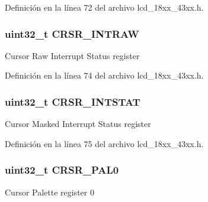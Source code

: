 Definición en la línea 72 del archivo lcd\+\_\+18xx\+\_\+43xx.\+h.

\subsubsection[{\texorpdfstring{C\+R\+S\+R\+\_\+\+I\+N\+T\+R\+AW}{CRSR_INTRAW}}]{ uint32\+\_\+t C\+R\+S\+R\+\_\+\+I\+N\+T\+R\+AW}\hypertarget{struct_l_p_c___l_c_d___t_a874b3ea8395c0fc025398db46000936f}{}\label{struct_l_p_c___l_c_d___t_a874b3ea8395c0fc025398db46000936f}
Cursor Raw Interrupt Status register 

Definición en la línea 74 del archivo lcd\+\_\+18xx\+\_\+43xx.\+h.

\subsubsection[{\texorpdfstring{C\+R\+S\+R\+\_\+\+I\+N\+T\+S\+T\+AT}{CRSR_INTSTAT}}]{ uint32\+\_\+t C\+R\+S\+R\+\_\+\+I\+N\+T\+S\+T\+AT}\hypertarget{struct_l_p_c___l_c_d___t_a3d40adb157e838d22ac5ab6b70705199}{}\label{struct_l_p_c___l_c_d___t_a3d40adb157e838d22ac5ab6b70705199}
Cursor Masked Interrupt Status register 

Definición en la línea 75 del archivo lcd\+\_\+18xx\+\_\+43xx.\+h.

\subsubsection[{\texorpdfstring{C\+R\+S\+R\+\_\+\+P\+A\+L0}{CRSR_PAL0}}]{ uint32\+\_\+t C\+R\+S\+R\+\_\+\+P\+A\+L0}\hypertarget{struct_l_p_c___l_c_d___t_a4acff3d59c7a09e4b8ce002b7c1d56c9}{}\label{struct_l_p_c___l_c_d___t_a4acff3d59c7a09e4b8ce002b7c1d56c9}
Cursor Palette register 0 

